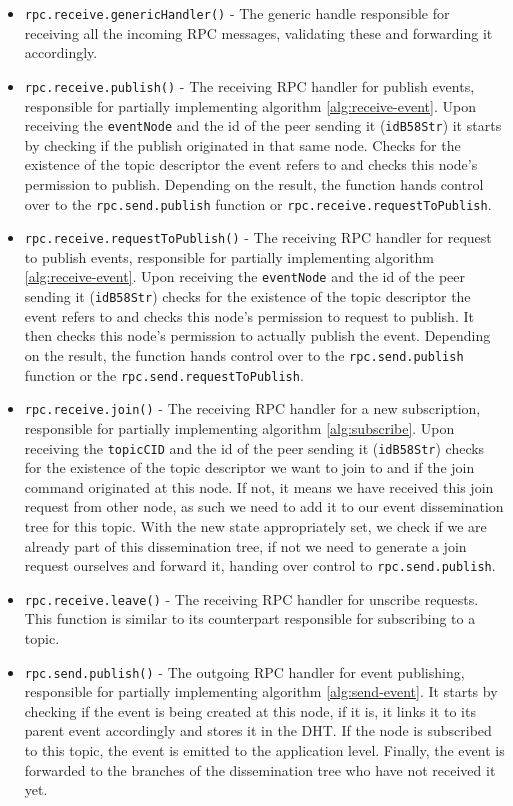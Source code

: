 \begin{itemize}
  \item
    \verb|rpc.receive.genericHandler()| - The generic handle responsible for receiving all the incoming RPC messages, validating these and forwarding it accordingly.
  \item
    \verb|rpc.receive.publish()| - The receiving RPC handler for publish events, responsible for partially implementing algorithm \ref{alg:receive-event}. Upon receiving the \verb|eventNode| and the id of the peer sending it (\verb|idB58Str|) it starts by checking if the publish originated in that same node. Checks for the existence of the topic descriptor the event refers to and checks this node's permission to publish. Depending on the result, the function hands control over to the \verb|rpc.send.publish| function or \verb|rpc.receive.requestToPublish|. 
  \item
    \verb|rpc.receive.requestToPublish()| - The receiving RPC handler for request to publish events, responsible for partially implementing algorithm \ref{alg:receive-event}. Upon receiving the \verb|eventNode| and the id of the peer sending it (\verb|idB58Str|) checks for the existence of the topic descriptor the event refers to and checks this node's permission to request to publish. It then checks this node's permission to actually publish the event. Depending on the result, the function hands control over to the \verb|rpc.send.publish| function or the \verb|rpc.send.requestToPublish|. 
  \item
    \verb|rpc.receive.join()| - The receiving RPC handler for a new subscription, responsible for partially implementing algorithm \ref{alg:subscribe}. Upon receiving the \verb|topicCID| and the id of the peer sending it (\verb|idB58Str|) checks for the existence of the topic descriptor we want to join to and if the join command originated at this node. If not, it means we have received this join request from other node, as such we need to add it to our event dissemination tree for this topic. With the new state appropriately set, we check if we are already part of this dissemination tree, if not we need to generate a join request ourselves and forward it, handing over control to \verb|rpc.send.publish|. 
  \item
    \verb|rpc.receive.leave()| - The receiving RPC handler for unscribe requests. This function is similar to its counterpart responsible for subscribing to a topic.
  \item
    \verb|rpc.send.publish()| - The outgoing RPC handler for event publishing, responsible for partially implementing algorithm \ref{alg:send-event}. It starts by checking if the event is being created at this node, if it is, it links it to its parent event accordingly and stores it in the DHT. If the node is subscribed to this topic, the event is emitted to the application level. Finally, the event is forwarded to the branches of the dissemination tree who have not received it yet.

\end{itemize}
